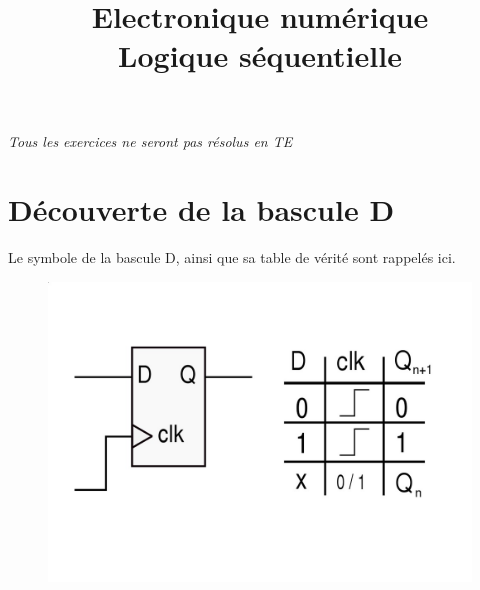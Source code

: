 \documentclass[a4paper,11pt]{article}
\title{{\Huge Electronique numérique}\\Logique séquentielle}
\begin{document}
\maketitle

{\it Tous les exercices ne seront pas résolus en TE}

\section{Découverte de la bascule D}
Le symbole de la bascule D, ainsi que sa table de vérité sont rappelés ici.\\

\begin{figure}[!h]
\begin{center}
\includegraphics[scale=0.2]{./figures/d-ff-infos.jpg}
\end{center}
\end{figure}
\end{document}

